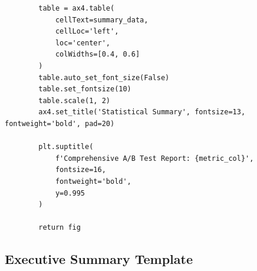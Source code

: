\begin{lstlisting}
        table = ax4.table(
            cellText=summary_data,
            cellLoc='left',
            loc='center',
            colWidths=[0.4, 0.6]
        )
        table.auto_set_font_size(False)
        table.set_fontsize(10)
        table.scale(1, 2)
        ax4.set_title('Statistical Summary', fontsize=13, fontweight='bold', pad=20)

        plt.suptitle(
            f'Comprehensive A/B Test Report: {metric_col}',
            fontsize=16,
            fontweight='bold',
            y=0.995
        )

        return fig

\end{lstlisting}

\subsection{Executive Summary Template}

